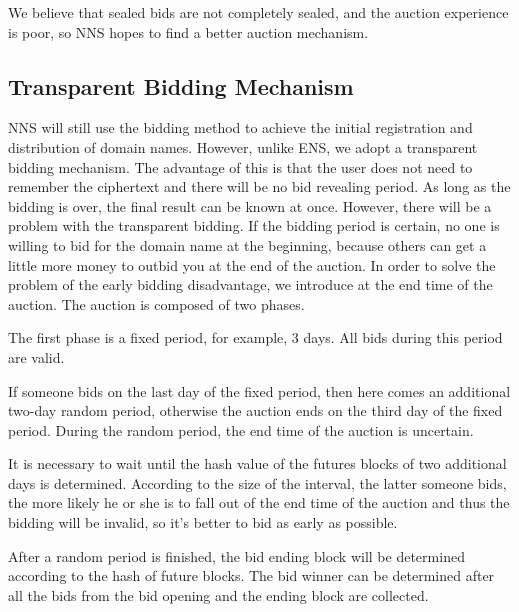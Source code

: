 \documentclass[letterpaper,10pt,english]{sphinxmanual}
\let\sphinxpxdimen\pdfpxdimen\else\newdimen\sphinxpxdimen
\begin{document}
We believe that sealed bids are not completely sealed, and the auction experience is poor, so NNS hopes to find a better auction mechanism.


\subsection{Transparent Bidding Mechanism}
\label{\detokenize{nns_protocol:transparent-bidding-mechanism}}
NNS will still use the bidding method to achieve the initial registration and distribution of domain names.
However, unlike ENS, we adopt a transparent bidding mechanism.
The advantage of this is that the user does not need to remember the ciphertext and there will be no bid revealing period.
As long as the bidding is over, the final result can be known at once.
However, there will be a problem with the transparent bidding.
If the bidding period is certain, no one is willing to bid for the domain name at the beginning,
because others can get a little more money to outbid you at the end of the auction.
In order to solve the problem of the early bidding disadvantage, we introduce  at the end time of the auction.
The auction is composed of two phases.


The first phase is a fixed period, for example, 3 days.
All bids during this period are valid.


If someone bids on the last day of the fixed period,
then here comes an additional two-day random period, otherwise the auction ends on the third day of the fixed period.
During the random period, the end time of the auction is uncertain.

It is necessary to wait until the hash value of the futures blocks of two additional days is determined.
According to the size of the interval, the latter someone bids,
the more likely he or she is to fall out of the end time of the auction and thus the bidding will be invalid,
so it’s better to bid as early as possible.


After a random period is finished,
the bid ending block will be determined according to the hash of future blocks.
The bid winner can be determined after all the bids from the bid opening and the ending block are collected.

\noindent{\hspace*{\fill}\scalebox{1.000000}{\sphinxincludegraphics[width=800\sphinxpxdimen,height=700\sphinxpxdimen]{{bidding}.jpeg}}\hspace*{\fill}}
\end{document}
